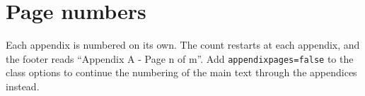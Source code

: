 \section{Page numbers}
Each appendix is numbered on its own. The count restarts at each appendix, and the footer reads ``Appendix A - Page n of m''. Add \texttt{appendixpages=false} to the class options to continue the numbering of the main text through the appendices instead.
